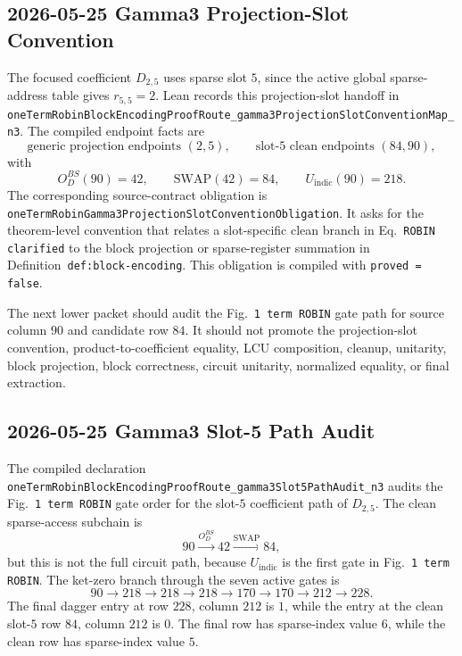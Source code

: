 \subsection{2026-05-25 Gamma3 Projection-Slot Convention}

The focused coefficient \(D_{2,5}\) uses sparse slot \(5\), since the active
global sparse-address table gives \(r_{5,5}=2\).  Lean records this
projection-slot handoff in
\texttt{oneTermRobinBlockEncodingProofRoute\_gamma3ProjectionSlotConventionMap\_n3}.
The compiled endpoint facts are
\[
  \text{generic projection endpoints }(2,5),
  \qquad
  \text{slot-}5\text{ clean endpoints }(84,90),
\]
with
\[
  O_D^{BS}(90)=42,
  \qquad
  \mathrm{SWAP}(42)=84,
  \qquad
  U_{\mathrm{indic}}(90)=218 .
\]
The corresponding source-contract obligation is
\texttt{oneTermRobinGamma3ProjectionSlotConventionObligation}.  It asks for
the theorem-level convention that relates a slot-specific clean branch in
Eq.~\texttt{ROBIN clarified} to the block projection or sparse-register
summation in Definition~\texttt{def:block-encoding}.  This obligation is
compiled with \texttt{proved = false}.

The next lower packet should audit the Fig.~\texttt{1 term ROBIN} gate path
for source column \(90\) and candidate row \(84\).  It should not promote the
projection-slot convention, product-to-coefficient equality, LCU composition,
cleanup, unitarity, block projection, block correctness, circuit unitarity,
normalized equality, or final extraction.

\subsection{2026-05-25 Gamma3 Slot-5 Path Audit}

The compiled declaration
\texttt{oneTermRobinBlockEncodingProofRoute\_gamma3Slot5PathAudit\_n3}
audits the Fig.~\texttt{1 term ROBIN} gate order for the slot-\(5\)
coefficient path of \(D_{2,5}\).  The clean sparse-access subchain is
\[
  90 \xrightarrow{O_D^{BS}} 42 \xrightarrow{\mathrm{SWAP}} 84,
\]
but this is not the full circuit path, because
\(U_{\mathrm{indic}}\) is the first gate in Fig.~\texttt{1 term ROBIN}.  The
ket-zero branch through the seven active gates is
\[
  90 \to 218 \to 218 \to 218 \to 170 \to 170 \to 212 \to 228.
\]
The final dagger entry at row \(228\), column \(212\) is \(1\), while the entry
at the clean slot-\(5\) row \(84\), column \(212\) is \(0\).  The final row
has sparse-index value \(6\), while the clean row has sparse-index value \(5\).

